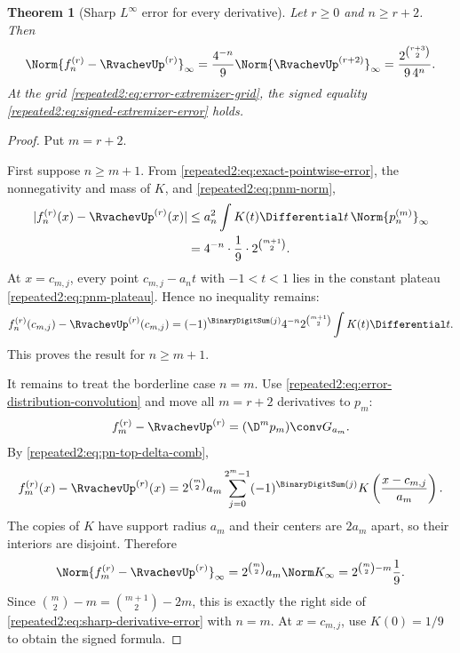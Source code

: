 \documentclass[11pt,oneside]{article}
\newtheorem{theorem}{Theorem}[section]
\theoremstyle{definition}
\theoremstyle{remark}
\begin{document}
\begin{theorem}[Sharp $L^\infty$ error for every derivative]
\label{repeated2:thm:sharp-derivative-error}
Let $r\ge0$ and $n\ge r+2$.  Then
\begin{equation}
 \Norm{f_n^{(r)}-\RvachevUp^{(r)}}_\infty
 =\frac{4^{-n}}{9}\Norm{\RvachevUp^{(r+2)}}_\infty
 =\frac{2^{\binom{r+3}{2}}}{9\,4^n}.
 \label{repeated2:eq:sharp-derivative-error}
\end{equation}
At the grid \eqref{repeated2:eq:error-extremizer-grid}, the signed equality
\eqref{repeated2:eq:signed-extremizer-error} holds.
\end{theorem}

\begin{proof}
Put $m=r+2$.

First suppose $n\ge m+1$.  From \eqref{repeated2:eq:exact-pointwise-error}, the nonnegativity and
mass of $K$, and \eqref{repeated2:eq:pnm-norm},
\begin{align*}
 |f_n^{(r)}(x)-\RvachevUp^{(r)}(x)|
 &\le a_n^2\int K(t)\Differential t\,\Norm{p_n^{(m)}}_\infty\\
 &=4^{-n}\cdot\frac19\cdot2^{\binom{m+1}{2}}.
\end{align*}
At $x=c_{m,j}$, every point $c_{m,j}-a_nt$ with $-1<t<1$ lies in the constant plateau
\eqref{repeated2:eq:pnm-plateau}.  Hence no inequality remains:
\[
 f_n^{(r)}(c_{m,j})-\RvachevUp^{(r)}(c_{m,j})
 =(-1)^{\BinaryDigitSum(j)}4^{-n}2^{\binom{m+1}{2}}\int K(t)\Differential t.
\]
This proves the result for $n\ge m+1$.

It remains to treat the borderline case $n=m$.  Use
\eqref{repeated2:eq:error-distribution-convolution} and move all $m=r+2$ derivatives to $p_m$:
\[
 f_m^{(r)}-\RvachevUp^{(r)}=(\D^mp_m)\conv G_{a_m}.
\]
By \eqref{repeated2:eq:pn-top-delta-comb},
\begin{equation}
 f_m^{(r)}(x)-\RvachevUp^{(r)}(x)
 =2^{\binom m2}a_m
 \sum_{j=0}^{2^m-1}(-1)^{\BinaryDigitSum(j)}
 K\left(\frac{x-c_{m,j}}{a_m}\right).
 \label{repeated2:eq:borderline-error-kernel-copies}
\end{equation}
The copies of $K$ have support radius $a_m$ and their centers are $2a_m$ apart, so their
interiors are disjoint.  Therefore
\[
 \Norm{f_m^{(r)}-\RvachevUp^{(r)}}_\infty
 =2^{\binom m2}a_m\Norm K_\infty
 =2^{\binom m2-m}\frac19.
\]
Since
$\binom m2-m=\binom{m+1}{2}-2m$, this is exactly the right side of
\eqref{repeated2:eq:sharp-derivative-error} with $n=m$.  At $x=c_{m,j}$, use $K(0)=1/9$ to obtain
the signed formula.
\end{proof}
\end{document}
